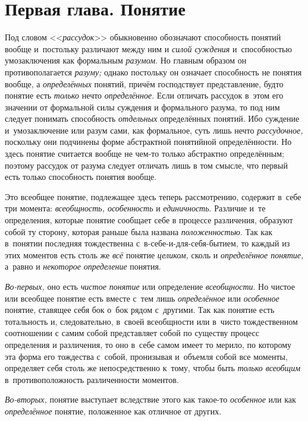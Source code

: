 \bigskip

\chapter[{\em Первая глава} Понятие]{Первая глава. Понятие}

Под словом <<{\em рассудок}>> обыкновенно обозначают способность
понятий вообще и~постольку различают между
ним и {\em силой суждения} и~способностью умозаключения как формальным
{\em разумом}. Но главным образом он противополагается
{\em разуму;} однако постольку он означает способность не понятия вообще, а
{\em определённых} понятий, причём господствует представление, будто понятие
есть {\em только} нечто {\em определённое}. Если
отличать рассудок в~этом его значении от формальной силы суждения и
формального разума, то под ним следует понимать способность {\em отдельных}
определённых понятий. Ибо суждение и~умозаключение или разум
сами, как формальное, суть лишь нечто {\em рассудочное,}
поскольку они подчинены форме абстрактной понятийной
определённости. Но здесь понятие считается вообще не чем-то только
абстрактно определённым; поэтому рассудок от разума следует отличать лишь в
том смысле, что первый есть только способность понятия вообще.

Это всеобщее понятие, подлежащее здесь теперь рассмотрению,
содержит в~себе три момента: {\em всеобщность, особенность} и
{\em единичность}. Различие и~те определения, которые понятие сообщает себе
в процессе различения, образуют собой ту сторону, которая раньше была названа
{\em положенностью}. Так
как в~понятии последняя тождественна с~в-себе-и-для-себя-бытием, то каждый
из этих моментов есть столь же {\em всё} понятие {\em целиком,} сколь и
{\em определённое понятие,} а~равно и {\em некоторое определение} понятия.

{\em Во-первых,} оно есть {\em чистое понятие} или определение
{\em всеобщности}. Но чистое или всеобщее понятие есть вместе с~тем лишь
{\em определённое} или {\em особенное} понятие,
ставящее себя бок о~бок рядом с~другими. Так как понятие есть тотальность
и, следовательно, в~своей всеобщности или в~чисто тождественном соотношении
с самим собой представляет собой по существу процесс определения и
различения, то оно в~себе самом имеет то мерило, по которому эта форма его
тождества с~собой, пронизывая и~объемля собой все моменты, определяет себя
столь же непосредственно к~тому, чтобы быть
{\em только всеобщим} в~противоположность различенности моментов.

{\em Во-вторых,} понятие выступает вследствие этого как такое-то
{\em особенное} или как {\em определённое} понятие, положенное как
отличное от других.

